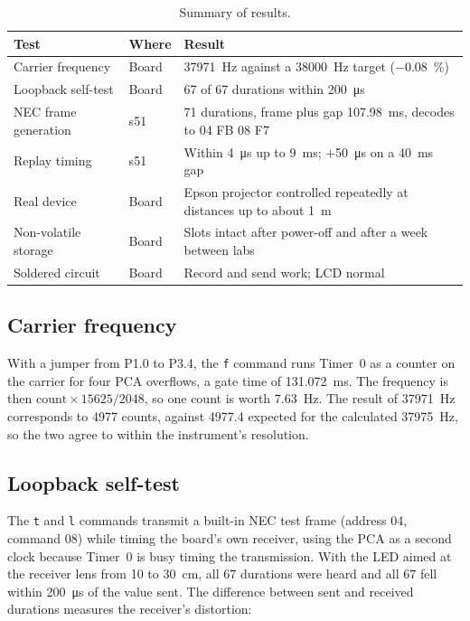 \documentclass[11pt,a4paper]{article}
\newcommand{\code}[1]{\texttt{#1}}
\begin{document}
\begin{table}[H]
\centering
\caption{Summary of results.}
\label{tab:results}
\begin{tabularx}{\textwidth}{llL}
\toprule
Test & Where & Result\\
\midrule
Carrier frequency & Board & \qty{37971}{\hertz} against a \qty{38000}{\hertz} target ($-$\qty{0.08}{\percent})\\
Loopback self-test & Board & 67 of 67 durations within \qty{200}{\micro\second}\\
NEC frame generation & s51 & 71 durations, frame plus gap \qty{107.98}{\milli\second}, decodes to 04 FB 08 F7\\
Replay timing & s51 & Within \qty{4}{\micro\second} up to \qty{9}{\milli\second}; $+$\qty{50}{\micro\second} on a \qty{40}{\milli\second} gap\\
Real device & Board & Epson projector controlled repeatedly at distances up to about \qty{1}{\metre}\\
Non-volatile storage & Board & Slots intact after power-off and after a week between labs\\
Soldered circuit & Board & Record and send work; LCD normal\\
\bottomrule
\end{tabularx}
\end{table}

\subsection{Carrier frequency}
\label{sec:carrier-test}

With a jumper from P1.0 to P3.4, the \code{f} command runs Timer~0 as a counter on the carrier for four PCA overflows, a gate time of \qty{131.072}{\milli\second}. The frequency is then $\mathrm{count} \times 15625 / 2048$, so one count is worth \qty{7.63}{\hertz}. The result of \qty{37971}{\hertz} corresponds to \num{4977} counts, against \num{4977.4} expected for the calculated \qty{37975}{\hertz}, so the two agree to within the instrument's resolution.

\subsection{Loopback self-test}
\label{sec:loopback}

The \code{t} and \code{l} commands transmit a built-in NEC test frame (address 04, command 08) while timing the board's own receiver, using the PCA as a second clock because Timer~0 is busy timing the transmission. With the LED aimed at the receiver lens from 10 to \qty{30}{\centi\metre}, all 67 durations were heard and all 67 fell within \qty{200}{\micro\second} of the value sent. The difference between sent and received durations measures the receiver's distortion:
\end{document}
